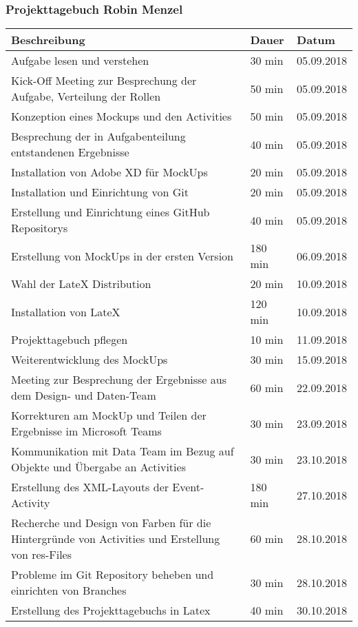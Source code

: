 \subsubsection{Projekttagebuch Robin Menzel}
\begin{longtable}{|p{10cm}|p{2cm}|p{2cm}|}
\hline
{\textbf{Beschreibung}} & {\textbf{Dauer}} & {\textbf{Datum}} \\ \hline
Aufgabe lesen und verstehen & 30 min & 05.09.2018 \\ \hline
Kick-Off Meeting zur Besprechung der Aufgabe, Verteilung der Rollen & 50 min & 05.09.2018 \\ \hline
Konzeption eines Mockups und den Activities & 50 min & 05.09.2018 \\ \hline
Besprechung der in Aufgabenteilung entstandenen Ergebnisse & 40 min & 05.09.2018 \\ \hline
Installation von Adobe XD für MockUps & 20 min & 05.09.2018 \\ \hline
Installation und Einrichtung von Git & 20 min & 05.09.2018 \\ \hline
Erstellung und Einrichtung eines GitHub Repositorys & 40 min & 05.09.2018 \\ \hline
Erstellung von MockUps in der ersten Version & 180 min & 06.09.2018 \\ \hline
Wahl der LateX Distribution & 20 min & 10.09.2018 \\ \hline
Installation von LateX & 120 min & 10.09.2018 \\ \hline
Projekttagebuch pflegen & 10 min & 11.09.2018\\ \hline
Weiterentwicklung des MockUps & 30 min & 15.09.2018\\ \hline
Meeting zur Besprechung der Ergebnisse aus dem Design- und Daten-Team & 60 min & 22.09.2018\\ \hline
Korrekturen am MockUp und Teilen der Ergebnisse im Microsoft Teams & 30 min & 23.09.2018\\ \hline
Kommunikation mit Data Team im Bezug auf Objekte und Übergabe an Activities & 30 min & 23.10.2018 \\ \hline
Erstellung des XML-Layouts der Event-Activity & 180 min & 27.10.2018\\ \hline
Recherche und Design von Farben für die Hintergründe von Activities und Erstellung von res-Files & 60 min & 28.10.2018\\ \hline
Probleme im Git Repository beheben und einrichten von Branches & 30 min & 28.10.2018\\ \hline
Erstellung des Projekttagebuchs in Latex & 40 min & 30.10.2018 \\ \hline

\end{longtable}
